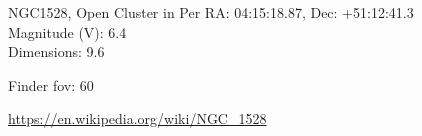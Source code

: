 \begin{block}{NGC1528, Open Cluster in Per}
    RA: 04:15:18.87, Dec: +51:12:41.3 \\ 
    Magnitude (V): 6.4 \\ 
    Dimensions: 9.6 

    Finder fov: 60 

    \url{https://en.wikipedia.org/wiki/NGC_1528} 
\end{block}